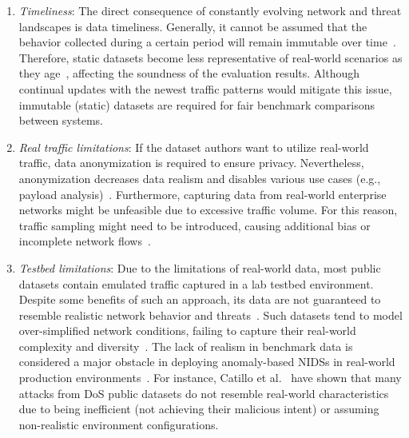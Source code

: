 \begin{enumerate}[wide, label={\arabic*)}, topsep=0pt, itemindent=\parindent, itemsep=0pt, parsep=0pt, partopsep=0pt]

\item \emph{Timeliness}: The direct consequence of constantly evolving network and threat landscapes is data timeliness. Generally, it cannot be assumed that the behavior collected during a certain period will remain immutable over time~\cite{viegas2017_trabid_dataset}. Therefore, static datasets become less representative of real-world scenarios as they age~\cite{catillo2023_ml_public_ids_datasets}, affecting the soundness of the evaluation results. Although continual updates with the newest traffic patterns would mitigate this issue, immutable (static) datasets are required for fair benchmark comparisons between systems.

\item \emph{Real traffic limitations}: If the dataset authors want to utilize real-world traffic, data anonymization is required to ensure privacy. Nevertheless, anonymization decreases data realism and disables various use cases (e.g., payload analysis)~\cite{abt2014_are_we_missing_labels}. Furthermore, capturing data from real-world enterprise networks might be unfeasible due to excessive traffic volume. For this reason, traffic sampling might need to be introduced, causing additional bias or incomplete network flows~\cite{silva2017_inside_packet_sampling, meng2018_enhancing_trust_wids_sampling}.

\item \emph{Testbed limitations}: Due to the limitations of real-world data, most public datasets contain emulated traffic captured in a lab testbed environment. Despite some benefits of such an approach, its data are not guaranteed to resemble realistic network behavior and threats~\cite{molinacoronado2020_survey_nids_kdd}. Such datasets tend to model over-simplified network conditions, failing to capture their real-world complexity and diversity~\cite{catillo2023_ml_public_ids_datasets,flood2024_bad_design_smells_nids_datasets}. The lack of realism in benchmark data is considered a major obstacle in deploying anomaly-based NIDSs in real-world production environments~\cite{sommer2010_sok_outside, viegas2017_trabid_dataset}. For instance, Catillo et al.~\cite{catillo2021_demystifying_public_ids_data} have shown that many attacks from DoS public datasets do not resemble real-world characteristics due to being inefficient (not achieving their malicious intent) or assuming non-realistic environment configurations.


\end{enumerate}
